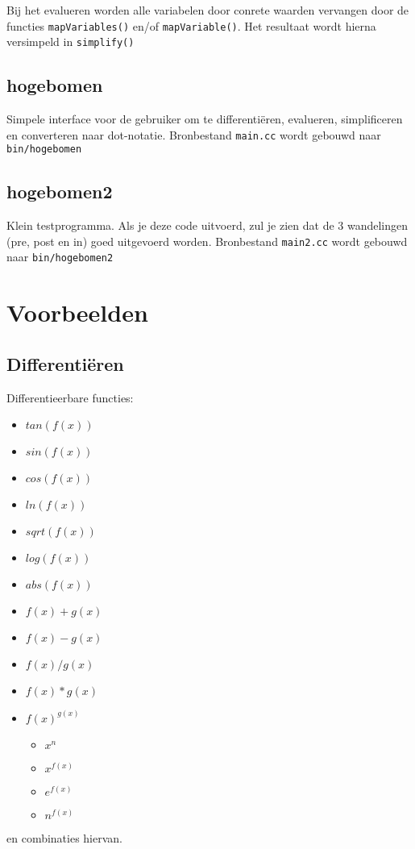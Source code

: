\documentclass[a4paper,10pt]{article}
\begin{document}
Bij het evalueren worden alle variabelen door conrete waarden vervangen door de functies \texttt{mapVariables()} en/of \texttt{mapVariable()}.
Het resultaat wordt hierna versimpeld in \texttt{simplify()}
\subsection*{hogebomen}
Simpele interface voor de gebruiker om te differentiëren, evalueren, simplificeren en converteren naar dot-notatie. Bronbestand \texttt{main.cc} wordt gebouwd naar \texttt{bin/hogebomen}

\subsection*{hogebomen2}
Klein testprogramma. Als je deze code uitvoerd, zul je zien dat de 3 wandelingen (pre, post en in) goed uitgevoerd worden. Bronbestand \texttt{main2.cc} wordt gebouwd naar \texttt{bin/hogebomen2}


\section*{Voorbeelden}
\subsection*{Differentiëren}
Differentieerbare functies:
\begin{itemize}
 \item $tan(f(x))$
 \item $sin(f(x))$
 \item $cos(f(x))$
 \item $ln(f(x))$
 \item $sqrt(f(x))$
 \item $log(f(x))$
 \item $abs(f(x))$
 \item $f(x) + g(x)$
 \item $f(x) - g(x)$
 \item $f(x) / g(x)$
 \item $f(x) * g(x)$
 \item $f(x) ^{g(x)}$
  \begin{itemize}
  \item $x ^{n}$
  \item $x ^{f(x)}$
  \item $e ^{f(x)}$
  \item $n ^{f(x)}$
  \end{itemize}
\end{itemize}
en combinaties hiervan. \\
\end{document}
